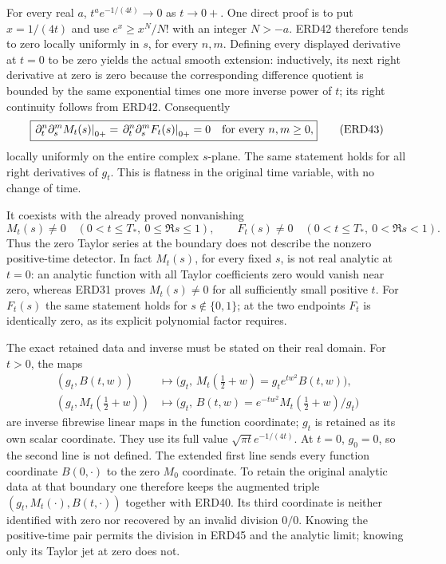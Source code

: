 \documentclass[
  10pt,
  a4paper,
]{article}
\begin{document}
For every real \(a\), \(t^a e^{-1/(4t)}\to0\) as \(t\to0+\). One direct
proof is to put \(x=1/(4t)\) and use \(e^x\ge x^N/N!\) with an integer
\(N>-a\). ERD42 therefore tends to zero locally uniformly in \(s\), for
every \(n,m\). Defining every displayed derivative at \(t=0\) to be zero
yields the actual smooth extension: inductively, its next right
derivative at zero is zero because the corresponding difference quotient
is bounded by the same exponential times one more inverse power of
\(t\); its right continuity follows from ERD42. Consequently \[
 \boxed{\displaystyle
 \left.\partial_t^n\partial_s^mM_t(s)\right|_{0+}
   =\left.\partial_t^n\partial_s^mF_t(s)\right|_{0+}=0
 \quad\hbox{for every }n,m\ge0,}
 \tag{ERD43}
\] locally uniformly on the entire complex \(s\)-plane. The same
statement holds for all right derivatives of \(g_t\). This is flatness
in the original time variable, with no change of time.

It coexists with the already proved nonvanishing \[
 M_t(s)\ne0\quad
       (0<t\le T_*,\ 0\le\Re s\le1),
 \qquad
 F_t(s)\ne0\quad
       (0<t\le T_*,\ 0<\Re s<1).
 \tag{ERD44}
\] Thus the zero Taylor series at the boundary does not describe the
nonzero positive-time detector. In fact \(M_t(s)\), for every fixed
\(s\), is not real analytic at \(t=0\): an analytic function with all
Taylor coefficients zero would vanish near zero, whereas ERD31 proves
\(M_t(s)\ne0\) for all sufficiently small positive \(t\). For \(F_t(s)\)
the same statement holds for \(s\notin\{0,1\}\); at the two endpoints
\(F_t\) is identically zero, as its explicit polynomial factor requires.

The exact retained data and inverse must be stated on their real domain.
For \(t>0\), the maps \[
 \begin{aligned}
 (g_t,B(t,w))
     &\longmapsto
        \big(g_t,\,
             M_t(\tfrac12+w)=g_te^{tw^2}B(t,w)\big),\\
 (g_t,M_t(\tfrac12+w))
     &\longmapsto
        \big(g_t,\,
             B(t,w)=e^{-tw^2}M_t(\tfrac12+w)/g_t\big)
 \end{aligned}
 \tag{ERD45}
\] are inverse fibrewise linear maps in the function coordinate; \(g_t\)
is retained as its own scalar coordinate. They use its full value
\(\sqrt{\pi t}e^{-1/(4t)}\). At \(t=0\), \(g_0=0\), so the second line
is not defined. The extended first line sends every function coordinate
\(B(0,\cdot)\) to the zero \(M_0\) coordinate. To retain the original
analytic data at that boundary one therefore keeps the augmented triple
\((g_t,M_t(\cdot),B(t,\cdot))\) together with ERD40. Its third
coordinate is neither identified with zero nor recovered by an invalid
division \(0/0\). Knowing the positive-time pair permits the division in
ERD45 and the analytic limit; knowing only its Taylor jet at zero does
not.
\end{document}
